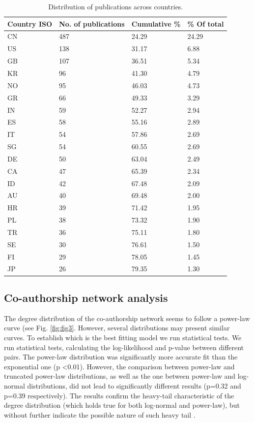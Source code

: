 \documentclass[a4paper, review, endfloat, authoryear]{elsarticle}
\begin{document}
	\begin{table}[h]
		\centering
		\caption{Distribution of publications across countries.}
		\begin{tabularx}{\linewidth}{XXXX}
			\hline
			Country ISO & No. of publications & Cumulative \% & \% Of total \\
			\hline
			CN & 487 & 24.29 & 24.29\\
			US & 138 & 31.17 & 6.88\\
			GB & 107 & 36.51 & 5.34\\
			KR & 96 & 41.30 & 4.79\\
			NO & 95 & 46.03 & 4.73\\
			GR & 66 & 49.33 & 3.29\\
			IN & 59 & 52.27 & 2.94\\
			ES & 58 & 55.16 & 2.89\\
			IT & 54 & 57.86 & 2.69\\
			SG & 54 & 60.55 & 2.69\\
			DE & 50 & 63.04 & 2.49\\
			CA & 47 & 65.39 & 2.34\\
			ID & 42 & 67.48 & 2.09\\
			AU & 40 & 69.48 & 2.00\\
			HR & 39 & 71.42 & 1.95\\
			PL & 38 & 73.32 & 1.90\\
			TR & 36 & 75.11 & 1.80\\
			SE & 30 & 76.61 & 1.50\\
			FI & 29 & 78.05 & 1.45\\
			JP & 26 & 79.35 & 1.30\\
			\hline
		\end{tabularx}
		\label{tab:resdesccountry}
	\end{table}

	\subsection{Co-authorship network analysis}
	The degree distribution of the co-authorship network seems to follow a power-law curve (see Fig. \ref{fig:fig3}. However, several distributions may present similar curves. To establish which is the best fitting model we run statistical tests. We run statistical tests, calculating the log-likelihood and p-value between different pairs. The power-law distribution was significantly more accurate fit than the exponential one (p \textless 0.01). However, the comparison between power-law and truncated power-law distributions, as well as the one between power-law and log-normal distributions, did not lead to significantly different results (p=0.32 and p=0.39 respectively). The results confirm the heavy-tail characteristic of the degree distribution (which holds true for both log-normal and power-law), but without further indicate the possible nature of such heavy tail \citep{mitzenmacher2004brief,higaki2020co,liu2021structural,smith2021explaining}.
	
\end{document}
